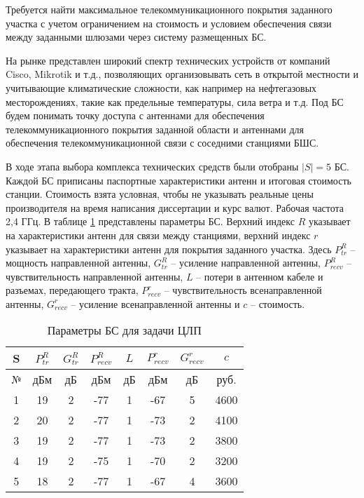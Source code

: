 Требуется найти максимальное телекоммуникационного покрытия заданного участка с учетом ограничением на стоимость и условием обеспечения связи между заданными шлюзами через систему размещенных БС.


На рынке представлен широкий спектр технических устройств от компаний Cisco, Mikrotik и т.д., позволяющих организовывать сеть в открытой местности и учитывающие климатические сложности, как например на нефтегазовых месторождениях, такие как предельные температуры, сила ветра и т.д. Под БС  будем понимать точку доступа с антеннами для обеспечения телекоммуникационного покрытия заданной области и антеннами для обеспечения телекоммуникационной связи с соседними станциями БШС. 

В ходе этапа выбора комплекса технических средств были отобраны $|S| = 5$ БС. Каждой БС приписаны паспортные характеристики антенн и итоговая стоимость станции. Стоимость взята условная, чтобы не указывать реальные цены производителя на время написания диссертации и курс валют. Рабочая частота 2,4 ГГц. В таблице \cref{tab:part4_sta_parameters_mip} представлены параметры БС. Верхний индекс $R$ указывает на характеристики антенн для связи между станциями, верхний индекс $r$ указывает на характеристики антенн для покрытия заданного участка. Здесь $P_{tr}^{R}$ -- мощность направленной антенны, $G_{tr}^R$ -- усиление направленной антенны, $P_{recv}^R$ -- чувствительность направленной антенны, $L$  -- потери в антенном кабеле и разъемах, передающего тракта, $P_{recv}^r$ -- чувствительность всенаправленной антенны, $G_{recv}^r$ -- усиление всенаправленной антенны и $c$ – стоимость.

\begin{table}[h!]\centering
  \begin{tabular}{|c||c|c|c|c|c|c|c|}\hline
      
      S&	$P_{tr}^R$&	$G_{tr}^R$&	$P_{recv}^R$&	$L$&	$P_{recv}^r$&	$G_{recv}^r$&		$c$ \\
      \hline
      №&	дБм&	дБ&	дБм&	дБ&	дБм&	дБ&		руб. \\
      \hline
      1&	19&	2&	-77&	1&	-67&	5&	  4600 \\
      2&	20&	2&	-77&	1&	-73&	2&		4100 \\
      3&	19&	2&	-77&	1&	-73&	2&		3800 \\
      4&	19&	2&	-75&	1&	-70&	2&		3200 \\
      5&	18&	2&	-77&	1&	-67&	4&		3600 \\
      \hline
  \end{tabular}\caption{Параметры БС для задачи ЦЛП}\label{tab:part4_sta_parameters_mip}
\end{table}


